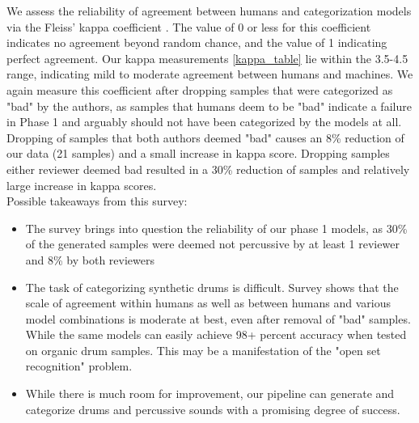 \documentclass{nime-alternate} %
\begin{document}
We assess the reliability of agreement between humans and categorization models via the Fleiss' kappa coefficient \cite{fleiss1971measuring}. The value of 0 or less for this coefficient indicates no agreement beyond random chance, and the value of 1 indicating perfect agreement. Our kappa measurements \ref{kappa_table} lie within the 3.5-4.5 range, indicating mild to moderate agreement between humans and machines. We again measure this coefficient after dropping samples that were categorized as "bad" by the authors, as samples that humans deem to be "bad" indicate a failure in Phase 1 and arguably should not have been categorized by the models at all. Dropping of samples that both authors deemed "bad" causes an 8\% reduction of our data (21 samples) and a small increase in kappa score. Dropping samples either reviewer deemed bad resulted in a 30\% reduction of samples and relatively large increase in kappa scores. \\

Possible takeaways from this survey:
\begin{itemize}
    \item The survey brings into question the reliability of our phase 1 models, as 30\% of the generated samples were deemed not percussive by at least 1 reviewer and 8\% by both reviewers
    \item The task of categorizing synthetic drums is difficult. Survey shows that the scale of agreement within humans as well as between humans and various model combinations is moderate at best, even after removal of "bad" samples.  While the same models can easily achieve 98+ percent accuracy when tested on organic drum samples. This may be a manifestation of the "open set recognition" problem. 
    \item While there is much room for improvement, our pipeline can generate and categorize drums and percussive sounds with a promising degree of success. 
\end{itemize}
\begin{center}

\begin{table}
\caption{\label{kappa_table}Table of Fleiss' kappa coefficient to measure the degree of agreement between humans (HvH), humans with FC model (H+FC), humans with CNNLSTM model, humans with all models (H+ALL), and the 3 models }
\end{table}
\end{center}
\end{document}
